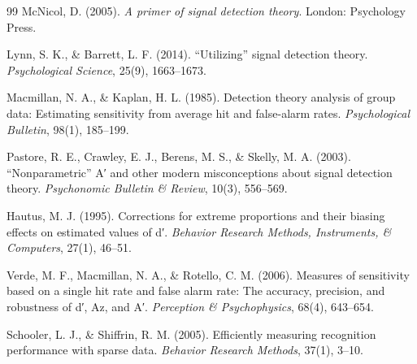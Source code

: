 \documentclass[11pt,a4paper]{article}
\begin{document}
\begin{thebibliography}{99}
McNicol, D. (2005). \textit{A primer of signal detection theory}. London: Psychology Press.

Lynn, S. K., \& Barrett, L. F. (2014). ``Utilizing'' signal detection theory. \textit{Psychological Science}, 25(9), 1663--1673.

Macmillan, N. A., \& Kaplan, H. L. (1985). Detection theory analysis of group data: Estimating sensitivity from average hit and false-alarm rates. \textit{Psychological Bulletin}, 98(1), 185--199.

Pastore, R. E., Crawley, E. J., Berens, M. S., \& Skelly, M. A. (2003). ``Nonparametric'' A′ and other modern misconceptions about signal detection theory. \textit{Psychonomic Bulletin \& Review}, 10(3), 556--569.

Hautus, M. J. (1995). Corrections for extreme proportions and their biasing effects on estimated values of d′. \textit{Behavior Research Methods, Instruments, \& Computers}, 27(1), 46--51.

Verde, M. F., Macmillan, N. A., \& Rotello, C. M. (2006). Measures of sensitivity based on a single hit rate and false alarm rate: The accuracy, precision, and robustness of d′, Az, and A′. \textit{Perception \& Psychophysics}, 68(4), 643--654.

Schooler, L. J., \& Shiffrin, R. M. (2005). Efficiently measuring recognition performance with sparse data. \textit{Behavior Research Methods}, 37(1), 3--10.

\end{thebibliography}
\end{document}
